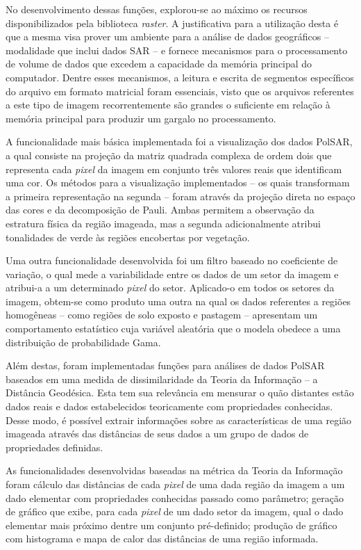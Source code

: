 \documentclass[12pt,letterpaper]{article}
\begin{document}
No desenvolvimento dessas funções, explorou-se ao máximo os recursos disponibilizados pela biblioteca \textit{raster}. A justificativa para a utilização desta é que a mesma visa prover um ambiente para a análise de dados geográficos -- modalidade que inclui dados SAR -- e fornece mecanismos para o processamento de volume de dados que excedem a capacidade da memória principal do computador. Dentre esses mecanismos, a leitura e escrita de segmentos específicos do arquivo em formato matricial foram essenciais, visto que os arquivos referentes a este tipo de imagem recorrentemente são grandes o suficiente em relação à memória principal para produzir um gargalo no processamento.

A funcionalidade mais básica implementada foi a visualização dos dados PolSAR, a qual consiste na projeção da matriz quadrada complexa de ordem dois que representa cada \textit{pixel} da imagem em conjunto três valores reais que identificam uma cor. Os métodos para a visualização implementados -- os quais transformam a primeira representação na segunda -- foram através da projeção direta no espaço das cores e da decomposição de Pauli. Ambas permitem a observação da estratura física da região imageada, mas a segunda adicionalmente atribui tonalidades de verde às regiões encobertas por vegetação. 

Uma outra funcionalidade desenvolvida foi um filtro baseado no coeficiente de variação, o qual mede a variabilidade entre os dados de um setor da imagem e atribui-a a um determinado \textit{pixel} do setor. Aplicado-o em todos os setores da imagem, obtem-se como produto uma outra na qual os dados referentes a regiões homogêneas -- como regiões de solo exposto e pastagem -- apresentam um comportamento estatístico cuja variável aleatória que o modela obedece a uma distribuição de probabilidade Gama.

Além destas, foram implementadas funções para análises de dados PolSAR baseados em uma medida de dissimilaridade da Teoria da Informação -- a Distância Geodésica. Esta tem sua relevância em mensurar o quão distantes estão dados reais e dados estabelecidos teoricamente com propriedades conhecidas. Desse modo, é possível extrair informações sobre as características de uma região imageada através das distâncias de seus dados a um grupo de dados de propriedades definidas. 

As funcionalidades desenvolvidas baseadas na métrica da Teoria da Informação foram cálculo das distâncias de cada \textit{pixel} de uma dada região da imagem a um dado elementar com propriedades conhecidas passado como parâmetro; geração de gráfico que exibe, para cada \textit{pixel} de um dado setor da imagem, qual o dado elementar mais próximo dentre um conjunto pré-definido; produção de gráfico com histograma e mapa de calor das distâncias de uma região informada. 
\end{document}
